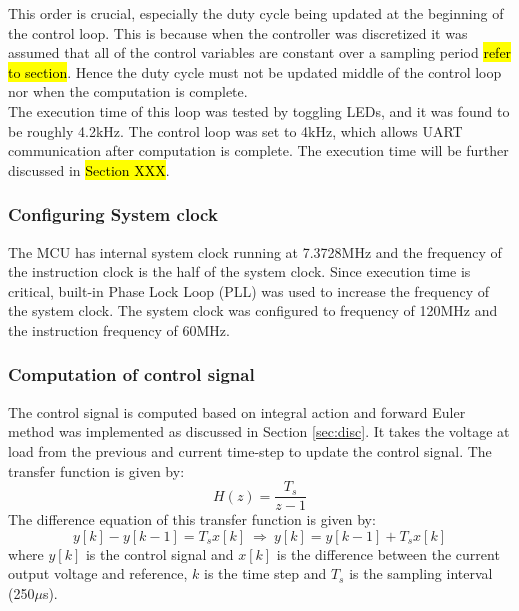 This order is crucial, especially the duty cycle being updated at the beginning of the control loop. This is because when the controller was discretized it was assumed that all of the control variables are constant over a sampling period \hl{refer to section}. Hence the duty cycle must not be updated middle of the control loop nor when the computation is complete.\\

The execution time of this loop was tested by toggling LEDs, and it was found to be roughly 4.2kHz. The control loop was set to 4kHz, which allows UART communication after computation is complete. The execution time will be further discussed in \hl{Section XXX}. 
\subsubsection{Configuring System clock}
The MCU has internal system clock running at 7.3728MHz and the frequency of the instruction clock is the half of the system clock. Since execution time is critical, built-in Phase Lock Loop (PLL) was used to increase the frequency of the system clock. The system clock was configured to frequency of 120MHz and the instruction frequency of 60MHz. 
\begin{comment}
    Timer 2 was configured as ADC triggering is available on TMR2. Timer count register gets incremented every rising edge of timer input clock. It is configured to take the internal clock running at 60MHz as timer source. The period of timer interrupt is controlled by PR2 (16bit) register. In order to trigger the interrupt at 10kHz, PR2 is set to:
    \begin{align*}
        PR2 
        & = \frac{F_{CY}}{PCLKDIV \times f_{desired}} \\
        & =  \frac{60MHz}{1 \times 10kHz} \\
        & = 6000 \text{ instruction cycles}
    \end{align*}
    where:
    $F_{CY}$ is the instruction clock cycle, which is half of system clock i.e. 60MHz\\
    $PCLKDIV$ is the input pre-scalar and is set to 1 providing 1:1 ratio.  
\end{comment}    

\subsubsection{Computation of control signal}
The control signal is computed based on integral action and forward Euler method was implemented as discussed in Section \ref{sec:disc}. It takes the voltage at load from the previous and current time-step to update the control signal. The transfer function is given by:
\[
    H(z) = \frac{T_s}{z-1}
\]
The difference equation of this transfer function is given by:
\[
    y[k] - y[k-1] = T_s x[k] \: \Longrightarrow \: y[k] = y[k-1] + T_s x[k]
\]
where $y[k]$ is the control signal and $x[k]$ is the difference between the current output voltage and reference, $k$ is the time step and $T_s$ is the sampling interval (250$\mu$s).

